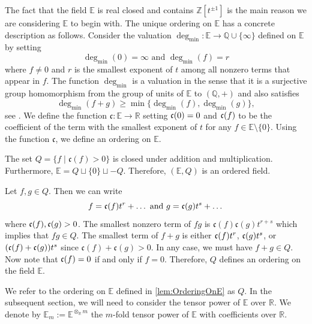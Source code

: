 \documentclass{amsart}
\makeatletter
\renewenvironment{proof}[1][\proofname]{%
   \par\pushQED{\qed}\normalfont%
   \topsep6\p@\@plus6\p@\relax
   \trivlist\item[\hskip\labelsep\bfseries#1\@addpunct{.}]%
   \ignorespaces
}{%
   \popQED\endtrivlist\@endpefalse
}
\makeatother
\begin{document}
The fact that the field $\mathbb{E}$ is real closed and contains $\mathbb{Z}[t^{\pm 1}]$ is the main reason we are considering $\mathbb{E}$ to begin with. The unique ordering on $\mathbb{E}$ has a concrete description as follows. Consider the valuation $\deg_{\min}:\mathbb{E} \to \mathbb{Q} \cup \{\infty\}$ defined on $\mathbb{E}$ by setting 
\begin{equation}\label{eq:DegreeMin}
\deg_{\min}(0)=\infty \text{ and } \deg_{\min}(f) = r 
\end{equation}
where $f\neq0$ and $r$ is the smallest exponent of $t$ among all nonzero terms that appear in $f$. The function $\deg_{\min}$ is a valuation in the sense that it is a surjective group homomorphism from the group of units of $\mathbb{E}$ to $(\mathbb{Q},+)$ and also satisfies
\[
\deg_{\min}(f+g) \geq \min\{\deg_{\min}(f),\deg_{\min}(g)\},
\]
see \cite[Chapter 1, \S 1]{SerreLocalFields}. We define the function $\mathfrak{c}: \mathbb{E} \to \mathbb{R}$ setting $\frak{c}(0)=0$ and $\frak{c}(f)$ to be the coefficient of the term with the smallest exponent of $t$ for any $f \in \mathbb{E} \setminus \{0\}$. Using the function $\mathfrak{c}$, we define an ordering on $\mathbb{E}$. 

\begin{lem}
    \label{lem:OrderingOnE}
    The set $Q=\{f \mid \mathfrak{c}(f) > 0\}$ is closed under addition and multiplication. Furthermore, $\mathbb{E} = Q \sqcup \{0\} \sqcup -Q$. Therefore, $(\mathbb{E},Q)$ is an ordered field. 
\end{lem}

\begin{proof}
    Let $f,g \in Q$. Then we can write 
    \[
    f = \frak{c}(f)t^r + \dots \text{ and } g = \frak{c}(g)t^s  + \dots
    \]
    where $\frak{c}(f), \frak{c}(g) > 0$. The smallest nonzero term of $fg$ is $\mathfrak{c}(f) \mathfrak{c}(g)t^{r+s}$ which implies that $fg \in Q$. The smallest term of $f+g$ is either $\frak{c}(f)t^r $, $\frak{c}(g)t^s$, or $(\frak{c}(f) +\frak{c}(g))t^s$ since $\mathfrak{c}(f) + \mathfrak{c}(g) > 0$. In any case, we must have $f+g \in Q$. Now note that $\frak{c}(f) = 0 $ if and only if $f = 0$. Therefore, $Q$ defines an ordering on the field $\mathbb{E}$.
\end{proof}

We refer to the ordering on $\mathbb{E}$ defined in \cref{lem:OrderingOnE} as $Q$. In the subsequent section, we will need to consider the tensor power of $\mathbb{E}$ over $\mathbb{R}$. We denote by $\mathbb{E}_m := \mathbb{E}^{\otimes_\mathbb{R} m}$ the $m$-fold tensor power of $\mathbb{E}$ with coefficients over $\mathbb{R}$.
\end{document}
